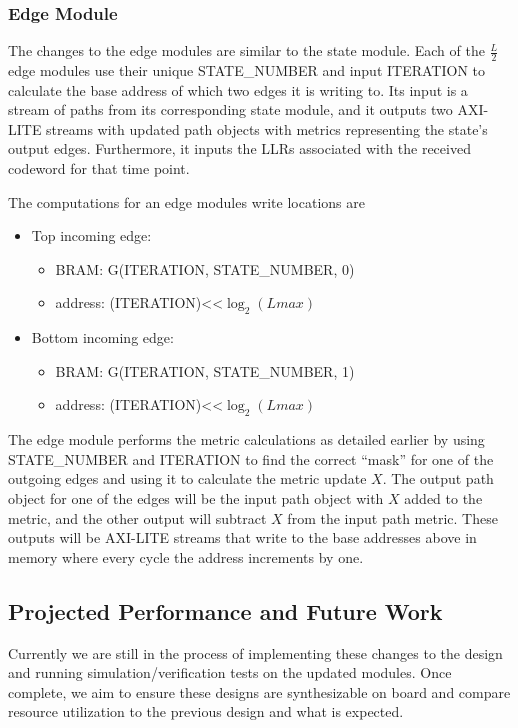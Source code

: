 \subsubsection{Edge Module}
The changes to the edge modules are similar to the state module. Each of the $\frac{L}{2}$ edge modules use their unique STATE\_NUMBER and input ITERATION to calculate the base address of which two edges it is writing to. Its input is a stream of paths from its corresponding state module, and it outputs two AXI-LITE streams with updated path objects with metrics representing the state’s output edges. Furthermore, it inputs the LLRs associated with the received codeword for that time point.

The computations for an edge modules write locations are

\begin{itemize}
    \item Top incoming edge:
    \begin{itemize}
        \item BRAM: G({ITERATION, STATE_NUMBER, 0})
        \item address: (ITERATION)<<$\log_2(Lmax)$
    \end{itemize}
    \item Bottom incoming edge:
        \begin{itemize}
        \item BRAM: G({ITERATION, STATE_NUMBER, 1})
        \item address: (ITERATION)<<$\log_2(Lmax)$
    \end{itemize}
\end{itemize}

The edge module performs the metric calculations as detailed earlier by using STATE\_NUMBER and ITERATION to find the correct “mask” for one of the outgoing edges and using it to calculate the metric update $X$. The output path object for one of the edges will be the input path object with $X$ added to the metric, and the other output will subtract $X$ from the input path metric. These outputs will be AXI-LITE streams that write to the base addresses above in memory where every cycle the address increments by one.

\subsection{Projected Performance and Future Work}
Currently we are still in the process of implementing these changes to the design and running simulation/verification tests on the updated modules. Once complete, we aim to ensure these designs are synthesizable on board and compare resource utilization to the previous design and what is expected.

